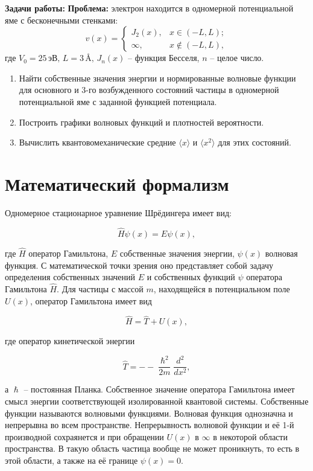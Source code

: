 \documentclass[a4paper, 12pt]{article}
\begin{document}
\textbf{Задачи работы:}
\textbf{Проблема:} электрон находится в одномерной потенциальной яме с бесконечными стенками:
\[
v(x) =
\begin{cases}
J_2(x), & x \in (-L, L); \\
\infty, & x \notin (-L, L),
\end{cases}
\]
где \( V_0 = 25 \, \text{эВ}, \, L = 3 \, \text{\AA}, \, J_n(x) \) -- функция Бесселя, \( n \) -- целое число.

\begin{enumerate}
    \item Найти собственные значения энергии и нормированные волновые функции для основного и 3-го возбужденного состояний частицы в одномерной потенциальной яме с заданной функцией потенциала.
    \item Построить графики волновых функций и плотностей вероятности.
    \item Вычислить квантовомеханические средние $\langle x \rangle$ и $\langle x^2 \rangle$ для этих состояний.
\end{enumerate}

\section{Математический формализм}
Одномерное стационарное уравнение Шрёдингера имеет вид:

\begin{equation}
    \hat{H}\psi(x) = E\psi(x),
\end{equation}

где $\hat{H}$ \textendash{} оператор Гамильтона, $E$ \textendash{} собственные значения энергии, $\psi(x)$ \textendash{} волновая функция.
С математической точки зрения оно представляет собой задачу определения собственных значений $E$ и собственных функций $\psi$ оператора Гамильтона $\hat{H}$. Для частицы с массой $m$, находящейся в потенциальном поле $U(x)$, оператор Гамильтона имеет вид

\begin{equation}
    \hat{H} = \hat{T} + U(x),
\end{equation}

где оператор кинетической энергии

\begin{equation}
    \hat{T} = --\frac{\hslash^2}{2m}\frac{d^2}{dx^2},
\end{equation}

а $\hslash$ -- постоянная Планка. Собственное значение оператора Гамильтона имеет смысл энергии соответствующей изолированной квантовой системы. Собственные функции называются волновыми функциями. Волновая функция однозначна и непрерывна во всем пространстве. Непрерывность волновой функции и её 1-й производной сохраянется и при обращении $U(x)$ в $\infty$ в некоторой области пространства. В такую область частица вообще не может проникнуть, то есть в этой области, а также на её границе $\psi(x)=0$.
\end{document}
